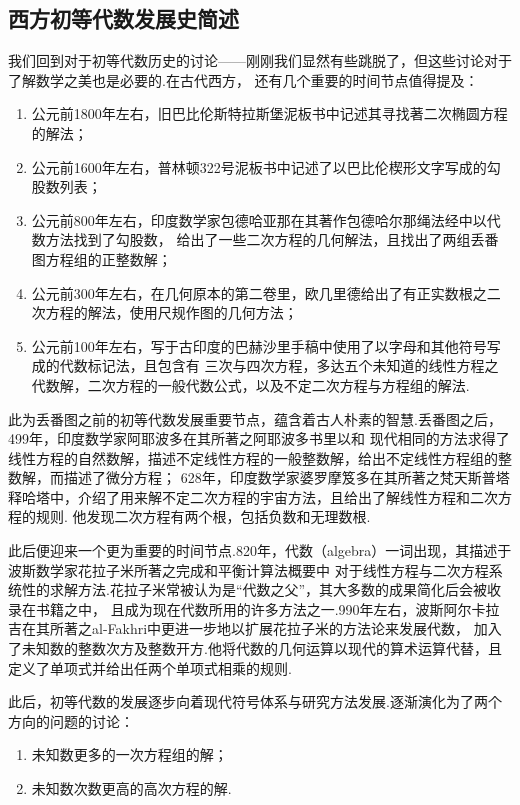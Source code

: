 \subsection{西方初等代数发展史简述}
我们回到对于初等代数历史的讨论——刚刚我们显然有些跳脱了，但这些讨论对于了解数学之美也是必要的.在古代西方，
还有几个重要的时间节点值得提及：
\begin{enumerate}
    \item 公元前1800年左右，旧巴比伦斯特拉斯堡泥板书中记述其寻找著二次椭圆方程的解法；
    \item 公元前1600年左右，普林顿322号泥板书中记述了以巴比伦楔形文字写成的勾股数列表；
    \item 公元前800年左右，印度数学家包德哈亚那在其著作包德哈尔那绳法经中以代数方法找到了勾股数，
    给出了一些二次方程的几何解法，且找出了两组丢番图方程组的正整数解；
    \item 公元前300年左右，在几何原本的第二卷里，欧几里德给出了有正实数根之二次方程的解法，使用尺规作图的几何方法；
    \item 公元前100年左右，写于古印度的巴赫沙里手稿中使用了以字母和其他符号写成的代数标记法，且包含有
    三次与四次方程，多达五个未知道的线性方程之代数解，二次方程的一般代数公式，以及不定二次方程与方程组的解法.
\end{enumerate}

此为丢番图之前的初等代数发展重要节点，蕴含着古人朴素的智慧.丢番图之后，499年，印度数学家阿耶波多在其所著之阿耶波多书里以和
现代相同的方法求得了线性方程的自然数解，描述不定线性方程的一般整数解，给出不定线性方程组的整数解，而描述了微分方程；
628年，印度数学家婆罗摩笈多在其所著之梵天斯普塔释哈塔中，介绍了用来解不定二次方程的宇宙方法，且给出了解线性方程和二次方程的规则.
他发现二次方程有两个根，包括负数和无理数根.

此后便迎来一个更为重要的时间节点.820年，代数（algebra）一词出现，其描述于波斯数学家花拉子米所著之完成和平衡计算法概要中
对于线性方程与二次方程系统性的求解方法.花拉子米常被认为是“代数之父”，其大多数的成果简化后会被收录在书籍之中，
且成为现在代数所用的许多方法之一.990年左右，波斯阿尔卡拉吉在其所著之al-Fakhri中更进一步地以扩展花拉子米的方法论来发展代数，
加入了未知数的整数次方及整数开方.他将代数的几何运算以现代的算术运算代替，且定义了单项式并给出任两个单项式相乘的规则.

此后，初等代数的发展逐步向着现代符号体系与研究方法发展.逐渐演化为了两个方向的问题的讨论：
\begin{enumerate}
    \item 未知数更多的一次方程组的解；
    \item 未知数次数更高的高次方程的解.
\end{enumerate}

